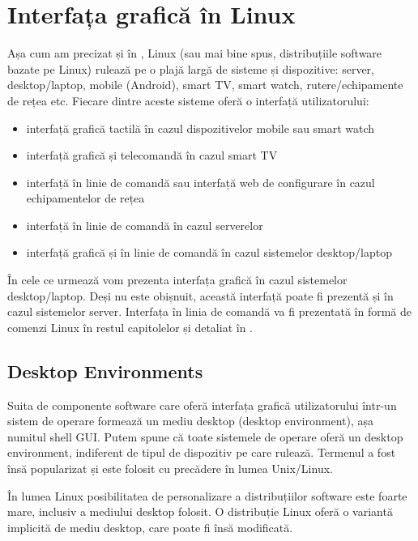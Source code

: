 \section{Interfața grafică în Linux}
\label{sec:ui:linux-gui}

Așa cum am precizat și în , Linux (sau mai bine spus, distribuțiile software bazate pe Linux) rulează pe o plajă largă de sisteme și dispozitive: server, desktop/laptop, mobile (Android), smart TV, smart watch, rutere/echipamente de rețea etc. Fiecare dintre aceste sisteme oferă o interfață utilizatorului:

\begin{itemize}
  \item interfață grafică tactilă în cazul dispozitivelor mobile sau smart watch
  \item interfață grafică și telecomandă în cazul smart TV
  \item interfață în linie de comandă sau interfață web de configurare în cazul echipamentelor de rețea
  \item interfață în linie de comandă în cazul serverelor
  \item interfață grafică și în linie de comandă în cazul sistemelor desktop/laptop
\end{itemize}

În cele ce urmează vom prezenta interfața grafică în cazul sistemelor desktop/laptop. Deși nu este obișnuit, această interfață poate fi prezentă și în cazul sistemelor server. Interfața în linia de comandă va fi prezentată în formă de comenzi Linux în restul capitolelor și detaliat în .

\subsection{Desktop Environments}
\label{sec:ui:desktop-environments}

Suita de componente software care oferă interfața grafică utilizatorului într-un sistem de operare formează un mediu desktop (desktop environment), așa numitul shell GUI. Putem spune că toate sistemele de operare oferă un desktop environment, indiferent de tipul de dispozitiv pe care rulează. Termenul a fost însă popularizat și este folosit cu precădere în lumea Unix/Linux.

În lumea Linux posibilitatea de personalizare a distribuțiilor software este foarte mare, inclusiv a mediului desktop folosit. O distribuție Linux oferă o variantă implicită de mediu desktop, care poate fi însă modificată.

